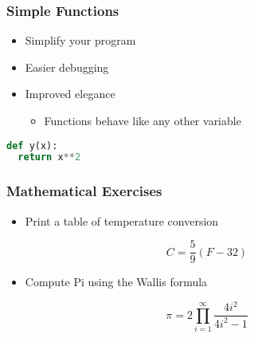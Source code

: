 \documentclass[xcolor=table,10pt,final]{beamer}
\begin{document}
\begin{frame}[fragile]
  \frametitle{Simple Functions}
  \begin{itemize}
    \item Simplify your program
    \item Easier debugging
    \item Improved elegance
      \begin{itemize}
        \item Functions behave like any other variable
      \end{itemize}
  \end{itemize}
\begin{lstlisting}[language=Python]
def y(x):
  return x**2
  \end{lstlisting}
\end{frame}

\begin{frame}
  \frametitle{Mathematical Exercises}
  \begin{itemize}
    \item Print a table of temperature conversion
  \end{itemize}
  \vskip1cm
  \begin{equation*}
    C = \frac{5}{9}\left(F - 32\right)
  \end{equation*}
  \begin{itemize}
    \item Compute Pi using the Wallis formula
  \end{itemize}
  \vskip1cm
  \begin{equation*}
    \pi = 2\prod^{\infty}_{i=1}\frac{4i^2}{4i^2-1}
  \end{equation*}
\end{frame}
\end{document}
